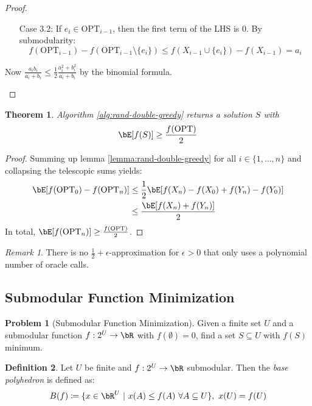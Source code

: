 \documentclass[11pt, a4paper]{article}
\newcommand{\mr}[1]{\mathrm{#1}}
\newcommand{\set}[1]{\{#1\}}
\newtheorem{theorem}{Theorem}[section]
\theoremstyle{remark}
\newtheorem*{uremark}{Remark}
\theoremstyle{definition}
\newtheorem{definition}[theorem]{Definition}
\newtheorem*{problem}{Problem}
\begin{document}
\begin{proof}
\begin{enumerate}
\begin{enumerate}
			\item[Case 3.2:] If $e_i\in\mr{OPT}_{i-1}$, then the first term of
			the LHS is 0. By submodularity:
			\[f(\mr{OPT}_{i-1})-f(\mr{OPT}_{i-1}\setminus\set{e_i})\leq f(X_{i-1}\cup\set{e_i})-f(X_{i-1})=a_i\]
		\end{enumerate}
		Now $\frac{a_ib_i}{a_i+b_i}\leq\frac{1}{2}\frac{a_i^2+b_i^2}{a_i+b_i}$
		by the binomial formula.
	\end{enumerate}
\end{proof}

\begin{theorem}
	Algorithm \ref{alg:rand-double-greedy} returns a solution $S$ with
	\[\bE[f(S)]\geq \frac{f(\mr{OPT})}{2}\]
\end{theorem}
\begin{proof}
	Summing up lemma \ref{lemma:rand-double-greedy} for all $i\in\set{1,\ldots,n}$
	and collapsing the telescopic sums yields:
	\begin{align*}
		\bE[f(\mr{OPT}_0)-f(\mr{OPT}_n)]&\leq \frac{1}{2}\bE[f(X_n)-f(X_0)+f(Y_n)-f(Y_0)] \\
		&\leq \frac{\bE[f(X_n)+f(Y_n)]}{2}
	\end{align*}
	In total, $\bE[f(\mr{OPT}_n)]\geq \frac{f(\mr{OPT})}{2}$.
\end{proof}

\begin{uremark}
	There is no $\frac{1}{2}+\epsilon$-approximation for $\epsilon>0$ that
	only uses a polynomial number of oracle calls.
\end{uremark}


\subsection{Submodular Function Minimization}

\begin{problem}[Submodular Function Minimization]
	Given a finite set $U$ and a submodular function $f: 2^U\to\bR$ with
	$f(\emptyset)=0$, find a set $S\subseteq U$ with $f(S)$ minimum.
\end{problem}

\setcounter{theorem}{52}
\begin{definition}
	Let $U$ be finite and $f: 2^U\to\bR$ submodular. Then the \emph{base
	polyhedron} is defined as:
	\[B(f)\coloneqq\set{x\in\bR^U\ |\ x(A)\leq f(A)\ \forall A\subseteq U},\ 
		x(U)=f(U)\]
\end{definition}
\end{document}
